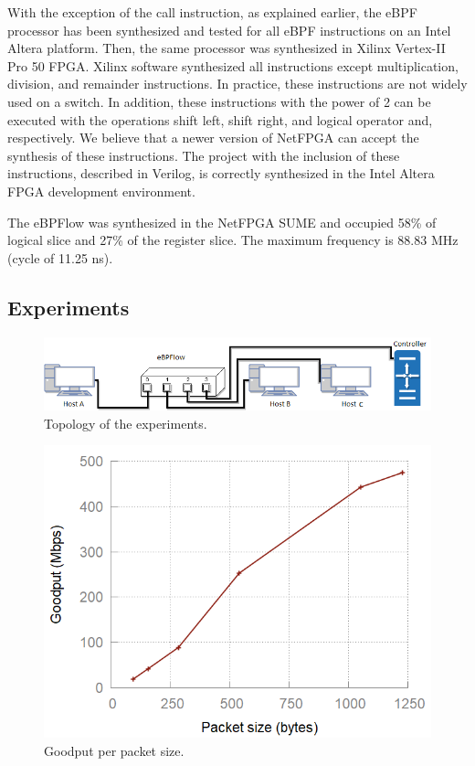 With the exception of the call instruction, as explained earlier, the eBPF processor has been synthesized and tested for all eBPF instructions on an Intel Altera platform. Then, the same processor was synthesized in Xilinx Vertex-II Pro 50 FPGA. Xilinx software synthesized all instructions except multiplication, division, and remainder instructions. In practice, these instructions are not widely used on a switch. In addition, these instructions with the power of 2 can be executed with the operations shift left, shift right, and logical operator and, respectively. We believe that a newer version of NetFPGA can accept the synthesis of these instructions. The project with the inclusion of these instructions, described in Verilog, is correctly synthesized in the Intel Altera FPGA development environment.


The eBPFlow was synthesized in the NetFPGA SUME and occupied 58\% of logical slice and 27\% of the register slice. The maximum frequency is 88.83 MHz (cycle of 11.25 ns).


\subsection{Experiments} 
\label{sec:experiments}

\begin{figure}[ht]
\centering
\includegraphics[width=1.\linewidth]{figures/07_fig03-3hosts.png}
\caption{Topology of the experiments.}
\label{fig:07_fig03}
\end{figure}

\begin{figure}[htb]
\centering
\includegraphics[width=1.\linewidth]{figures/goodputxbytes.png}
\caption{Goodput per packet size.}
\label{fig:07result}
\end{figure}

